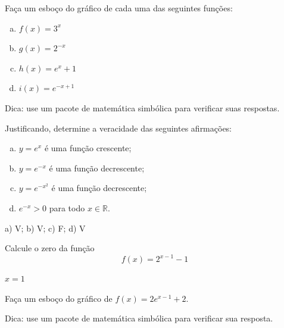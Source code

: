 \begin{exer}
  Faça um esboço do gráfico de cada uma das seguintes funções:
  \begin{enumerate}[a)]
  \item $f(x) = 3^x$
  \item $g(x) = 2^{-x}$
  \item $h(x) = e^x+1$
  \item $i(x) = e^{-x+1}$
  \end{enumerate}
\end{exer}
\begin{resp}
  Dica: use um pacote de matemática simbólica para verificar suas respostas.
\end{resp}

\begin{exer}
  Justificando, determine a veracidade das seguintes afirmações:
  \begin{enumerate}[a)]
  \item $y=e^x$ é uma função crescente;
  \item $y=e^{-x}$ é uma função decrescente;
  \item $y=e^{-x^2}$ é uma função decrescente;
  \item $e^{-x}> 0$ para todo $x\in\mathbb{R}$. 
  \end{enumerate}
\end{exer}
\begin{resp}
  a) V; b) V; c) F; d) V
\end{resp}

\begin{exer}
  Calcule o zero da função
  \begin{equation}
    f(x) = 2^{x-1}-1
  \end{equation}
\end{exer}
\begin{resp}
  $x=1$
\end{resp}

\begin{exer}
  Faça um esboço do gráfico de $f(x) = 2e^{x-1}+2$.
\end{exer}
\begin{resp}
  Dica: use um pacote de matemática simbólica para verificar sua resposta.
\end{resp}

